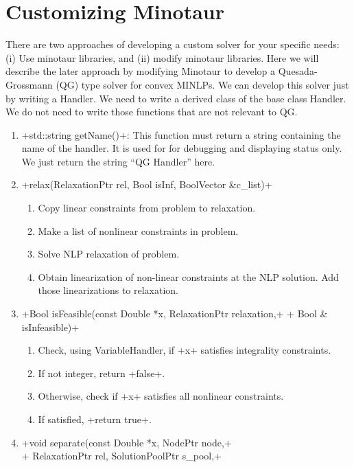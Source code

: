 
\section{Customizing Minotaur}

There are two approaches of developing a custom solver for your specific
needs: (i) Use minotaur libraries, and (ii) modify minotaur libraries. Here we
will describe the later approach by modifying Minotaur to develop a
Quesada-Grossmann (QG) type solver for convex MINLPs. We can develop this
solver just by writing a Handler. We need to write a derived class of the base
class Handler. We do not need to write those functions that are not relevant
to QG.

\begin{enumerate}
\item \code+std::string getName()+: This function must return a string
containing the name of the handler. It is used for for
debugging and displaying status only. We just return the string ``QG Handler''
here.
\item \code+relax(RelaxationPtr rel, Bool isInf, BoolVector &c_list)+ 
\begin{enumerate}
\item Copy linear constraints from problem to relaxation. 
\item Make a list of nonlinear constraints in problem.
\item Solve NLP relaxation of problem.
\item Obtain linearization of non-linear constraints at the NLP solution. Add
those linearizations to relaxation.
\end{enumerate}
\item \code+Bool isFeasible(const Double *x, RelaxationPtr relaxation,+
\code+ Bool & isInfeasible)+ 
\begin{enumerate}
\item Check, using VariableHandler, if \code+x+ satisfies integrality 
constraints.
\item If not integer, return \code+false+.
\item Otherwise, check if \code+x+ satisfies all nonlinear constraints.
\item If satisfied, \code+return true+.
\end{enumerate}
\item \code+void separate(const Double *x, NodePtr node,+\\
\code+ RelaxationPtr rel, SolutionPoolPtr s_pool,+\\

\end{enumerate}
